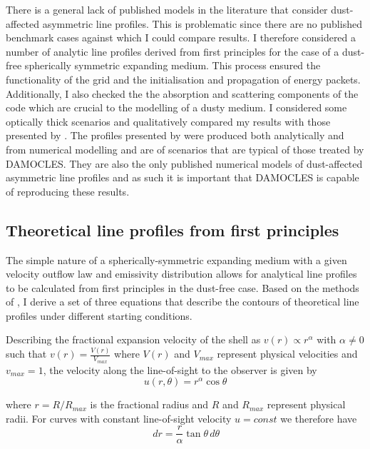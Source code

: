 There is a general lack of published models in the literature that consider dust-affected asymmetric line profiles.  This is problematic since there are no published benchmark cases against which I could compare results.  I therefore considered a number of analytic line profiles derived from first principles for the case of a dust-free spherically symmetric expanding medium.  This process ensured the functionality of the grid and the initialisation and propagation of energy packets.  Additionally, I also checked the the absorption and scattering components of the code which are crucial to the modelling of a dusty medium.  I  considered some optically thick scenarios and qualitatively compared my results with those presented by \citet{Lucy1989}.  The profiles presented by  \citet{Lucy1989} were produced both analytically and from numerical modelling and are of scenarios that are typical of those treated by DAMOCLES.  They are also the only published numerical models of dust-affected asymmetric line profiles and as such it is important that DAMOCLES is capable of reproducing these results.

\subsection{Theoretical line profiles from first principles}
\label{analytics}

The simple nature of a spherically-symmetric expanding medium with a given velocity outflow law and emissivity distribution allows for analytical line profiles to be calculated from first principles in the dust-free case.  Based on the methods of \cite{Gerasimovic1933},  I derive a set of three equations that describe the contours of theoretical line profiles under different starting conditions.



Describing the fractional expansion velocity of the shell as $v(r) \propto 
r^\alpha$ with $\alpha \neq 0$ such that $v(r)=\frac{V(r)}{V_{max}}$ where 
$V(r)$ and $V_{max}$ represent physical velocities and $v_{max}=1$, the velocity along the line-of-sight to the observer is given by 
\begin{equation}
\label{eqn:radial_vel}
u(r,\theta)=r^\alpha \cos \theta
\end{equation}

\noindent where $r=R/R_{max}$ is the fractional radius and $R$ and $R_{max}$ represent physical radii. For curves with constant line-of-sight velocity $u=const$ we therefore have
\begin{equation}
\,d r = \frac{r}{\alpha} \tan \theta \,d \theta
\end{equation}

